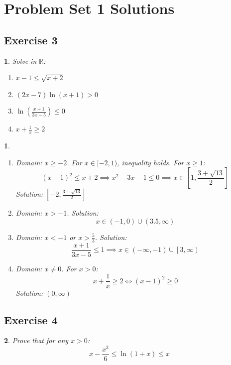 \documentclass[12pt]{article}
\newtheorem{problem}{}
\newtheorem*{solution}{}
\begin{document}
\section*{Problem Set 1 Solutions}

\subsection*{Exercise 3}
\begin{problem}
Solve in \( \mathbb{R} \):
\begin{enumerate}
    \item \( x - 1 \leq \sqrt{x + 2} \)
    \item \( (2x - 7)\ln(x + 1) > 0 \)
    \item \( \ln\left(\frac{x + 1}{3x - 5}\right) \leq 0 \)
    \item \( x + \frac{1}{x} \geq 2 \)
\end{enumerate}
\end{problem}

\begin{solution}
\begin{enumerate}
    \item Domain: \( x \geq -2 \). For \( x \in [-2, 1) \), inequality holds. For \( x \geq 1 \):
    \[
    (x - 1)^2 \leq x + 2 \implies x^2 - 3x - 1 \leq 0 \implies x \in \left[1, \frac{3 + \sqrt{13}}{2}\right]
    \]
    Solution: \( \left[-2, \frac{3 + \sqrt{13}}{2}\right] \)
    
    \item Domain: \( x > -1 \). Solution:
    \[
    x \in (-1, 0) \cup (3.5, \infty)
    \]
    
    \item Domain: \( x < -1 \) or \( x > \frac{5}{3} \). Solution:
    \[
    \frac{x + 1}{3x - 5} \leq 1 \implies x \in (-\infty, -1) \cup \left[3, \infty\right)
    \]
    
    \item Domain: \( x \neq 0 \). For \( x > 0 \):
    \[
    x + \frac{1}{x} \geq 2 \iff (x - 1)^2 \geq 0
    \]
    Solution: \( (0, \infty) \)
\end{enumerate}
\end{solution}

\subsection*{Exercise 4}
\begin{problem}
Prove that for any \( x > 0 \):
\[
x - \frac{x^3}{6} \leq \ln(1 + x) \leq x
\]
\end{problem}
\end{document}
